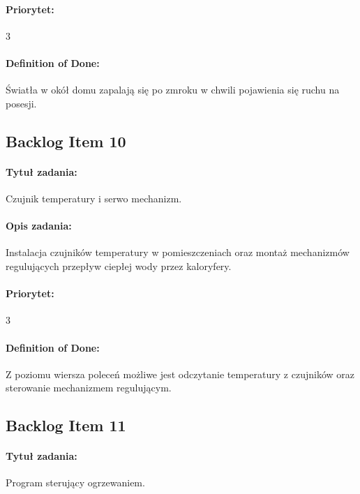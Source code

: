 	\paragraph{Priorytet:}
	3
	
	\paragraph{Definition of Done:}
	Światła w okół domu zapalają się po zmroku w chwili pojawienia się ruchu na posesji.



	\subsection{Backlog Item 10}
	\paragraph{Tytuł zadania:}
	Czujnik temperatury i serwo mechanizm.
	
	\paragraph{Opis zadania:} 
	Instalacja czujników temperatury w pomieszczeniach oraz montaż mechanizmów regulujących przepływ ciepłej wody przez kaloryfery.
	
	\paragraph{Priorytet:}
	3
	
	\paragraph{Definition of Done:} 
	Z poziomu wiersza poleceń możliwe jest odczytanie temperatury z czujników oraz sterowanie mechanizmem regulującym.
	


\subsection{Backlog Item 11}
\paragraph{Tytuł zadania:}
Program sterujący ogrzewaniem.

